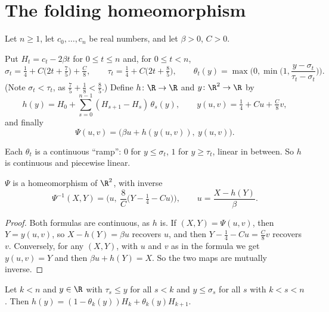 
\section{The folding homeomorphism}\label{sec:shear}

Let $n\ge1$, let $c_0,\dots,c_n$ be real numbers, and let $\beta>0$, $C>0$.

\begin{definition}\label{def:fold}
Put $H_t=c_t-2\beta t$ for $0\le t\le n$ and, for $0\le t<n$,
\[
\sigma_t=\tfrac14+C\big(2t+\tfrac75\big)+\tfrac C8,\qquad\tau_t=\tfrac14+C\big(2t+\tfrac85\big),
\qquad\theta_t(y)=\max\Big(0,\min\Big(1,\frac{y-\sigma_t}{\tau_t-\sigma_t}\Big)\Big).
\]
(Note $\sigma_t<\tau_t$, as $\frac75+\frac18<\frac85$.) Define $h\colon\R\to\R$ and
$y\colon\R^2\to\R$ by
\[
h(y)=H_0+\sum_{s=0}^{n-1}(H_{s+1}-H_s)\,\theta_s(y),\qquad y(u,v)=\tfrac14+Cu+\tfrac C8v,
\]
and finally
\[
\Psi(u,v)=\big(\beta u+h(y(u,v)),\ y(u,v)\big).
\]
\end{definition}


Each $\theta_t$ is a continuous ``ramp'': $0$ for $y\le\sigma_t$, $1$ for $y\ge\tau_t$, linear in
between. So $h$ is continuous and piecewise linear.

\begin{lemma}\label{lem:psi-homeo}
$\Psi$ is a homeomorphism of $\R^2$, with inverse
\[
\Psi^{-1}(X,Y)=\Big(u,\ \frac{8}{C}\big(Y-\tfrac14-Cu\big)\Big),\qquad u=\frac{X-h(Y)}{\beta}.
\]
\end{lemma}

\begin{proof}
Both formulas are continuous, as $h$ is. If $(X,Y)=\Psi(u,v)$, then $Y=y(u,v)$, so
$X-h(Y)=\beta u$ recovers $u$, and then $Y-\frac14-Cu=\frac C8v$ recovers $v$. Conversely, for any
$(X,Y)$, with $u$ and $v$ as in the formula we get $y(u,v)=Y$ and then $\beta u+h(Y)=X$. So the
two maps are mutually inverse.
\end{proof}

\begin{lemma}\label{lem:h-value}
Let $k<n$ and $y\in\R$ with $\tau_s\le y$ for all $s<k$ and $y\le\sigma_s$ for all $s$ with
$k<s<n$. Then $h(y)=(1-\theta_k(y))H_k+\theta_k(y)H_{k+1}$.
\end{lemma}

